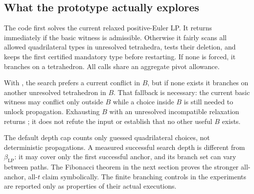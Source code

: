 

\subsection{What the prototype actually explores}

The code first solves the current relaxed positive-Euler LP. It returns immediately if the basic witness is admissible. Otherwise it fairly scans all allowed quadrilateral types in unresolved tetrahedra, tests their deletion, and keeps the first certified mandatory type before restarting. If none is forced, it branches on a tetrahedron. All calls share an aggregate pivot allowance.

With , the search prefers a current conflict in $B$, but if none exists it branches on another unresolved tetrahedron in $B$. That fallback is necessary: the current basic witness may conflict only outside $B$ while a choice inside $B$ is still needed to unlock propagation. Exhausting $B$ with an unresolved incompatible relaxation returns ; it does not refute the input or establish that no other useful $B$ exists.

The default depth cap counts only guessed quadrilateral choices, not deterministic propagations. A measured successful search depth is different from $\beta_{\mathrm{LP}}$: it may cover only the first successful anchor, and its branch set can vary between paths. The Fibonacci theorem in the next section proves the stronger all-anchor, all-$t$ claim symbolically. The finite branching controls in the experiments are reported only as properties of their actual executions.
